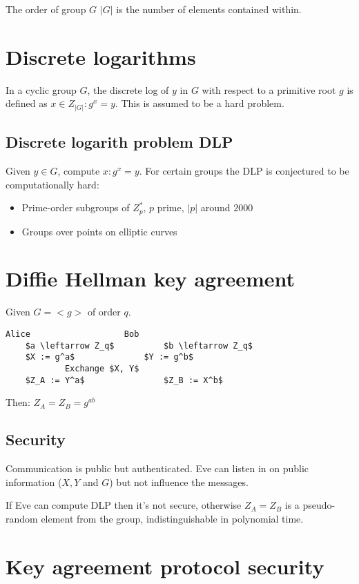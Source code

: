 \documentclass[a4paper]{scrreprt}
\begin{document}
The order of group $G$ $|G|$ is the number of elements contained within.

\section{Discrete logarithms}

In a cyclic group $G$, the discrete log of $y$ in $G$ with respect to a
primitive root $g$ is defined as $x \in Z_{|G|} : g^x = y$. This is assumed to
be a hard problem.

\subsection{Discrete logarith problem DLP}

Given $y \in G$, compute $x : g^x = y$. For certain groups the DLP is
conjectured to be computationally hard:

\begin{itemize}
	\item Prime-order subgroups of $Z^{*}_p$, $p$ prime, $|p|$ around $2000$
	\item Groups over points on elliptic curves
\end{itemize}

\section{Diffie Hellman key agreement}

Given $G = <g>$ of order $q$.

\begin{lstlisting}[mathescape=true,autogobble=true]
	Alice					Bob
	$a \leftarrow Z_q$			$b \leftarrow Z_q$
	$X := g^a$				$Y := g^b$
			Exchange $X, Y$
	$Z_A := Y^a$				$Z_B := X^b$
\end{lstlisting}

Then: $Z_A = Z_B = g^{ab}$

\subsection{Security}

Communication is public but authenticated. Eve can listen in on public
information ($X, Y$ and $G$) but not influence the messages.

If Eve can compute DLP then it's not secure, otherwise $Z_A = Z_B$ is a
pseudo-random element from the group, indistinguishable in polynomial time.

\section{Key agreement protocol security}
\end{document}
